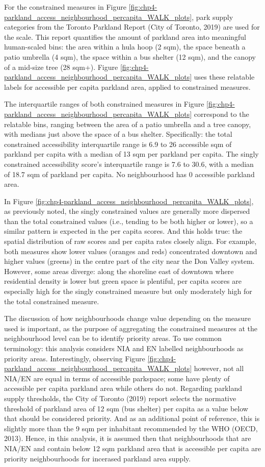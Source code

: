 \documentclass[
11pt, %
oneside, %
english, %
singlespacing, %
]{macthesis} %
\begin{document}
For the constrained measures in Figure \ref{fig:chp4-parkland_access_neighbourhood_percapita_WALK_plots}, park supply categories from the Toronto Parkland Report (City of Toronto, 2019) are used for the scale. This report quantifies the amount of parkland area into meaningful human-scaled bins: the area within a hula hoop (2 sqm), the space beneath a patio umbrella (4 sqm), the space within a bus shelter (12 sqm), and the canopy of a mid-size tree (28 sqm+). Figure \ref{fig:chp4-parkland_access_neighbourhood_percapita_WALK_plots} uses these relatable labels for accessible per capita parkland area, applied to constrained measures.

The interquartile ranges of both constrained measures in Figure \ref{fig:chp4-parkland_access_neighbourhood_percapita_WALK_plots} correspond to the relatable bins, ranging between the area of a patio umbrella and a tree canopy, with medians just above the space of a bus shelter. Specifically: the total constrained accessibility interquartile range is 6.9 to 26 accessible sqm of parkland per capita with a median of 13 sqm per parkland per capita. The singly constrained accessibility score's interquartile range is 7.6 to 30.6, with a median of 18.7 sqm of parkland per capita. No neighbourhood has 0 accessible parkland area.

In Figure \ref{fig:chp4-parkland_access_neighbourhood_percapita_WALK_plots}, as previously noted, the singly constrained values are generally more dispersed than the total constrained values (i.e., tending to be both higher or lower), so a similar pattern is expected in the per capita scores. And this holds true: the spatial distribution of raw scores and per capita rates closely align. For example, both measures show lower values (oranges and reds) concentrated downtown and higher values (greens) in the centre part of the city near the Don Valley system. However, some areas diverge: along the shoreline east of downtown where residential density is lower but green space is plentiful, per capita scores are especially high for the singly constrained measure but only moderately high for the total constrained measure.

The discussion of how neighbourhoods change value depending on the measure used is important, as the purpose of aggregating the constrained measures at the neighbourhood level can be to identify priority areas. To use common terminology: this analysis considers NIA and EN labelled neighbourhoods as priority areas. Interestingly, observing Figure \ref{fig:chp4-parkland_access_neighbourhood_percapita_WALK_plots} however, not all NIA/EN are equal in terms of accessible parkspace; some have plenty of accessible per capita parkland area while others do not. Regarding parkland supply thresholds, the City of Toronto (2019) report selects the normative threshold of parkland area of 12 sqm (bus shelter) per capita as a value below that should be considered priority. And as an additional point of reference, this is slightly more than the 9 sqm per inhabitant recommended by the WHO (OECD, 2013). Hence, in this analysis, it is assumed then that neighbourhoods that are NIA/EN and contain below 12 sqm parkland area that is accessible per capita are priority neighbourhoods for incerased parkland area supply.
\end{document}

